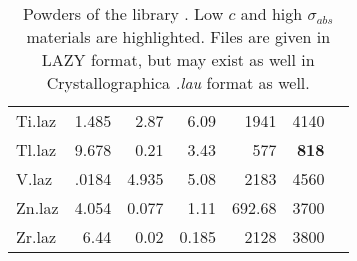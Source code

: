 \begin{table}
\begin{center}
{\begin{small}
\begin{tabular}{|l|rrr|rr|p{}|}
Ti.laz             & 1.485     & 2.87     &6.09      &1941      &4140&\\
Tl.laz             & 9.678     & 0.21     &3.43      &577       &{\bf 818}&\\
V.laz              & .0184     & 4.935    &5.08      &2183      &4560&\\
Zn.laz             & 4.054     & 0.077    &1.11      &692.68    &3700&\\
Zr.laz             & 6.44      & 0.02     &0.185     &2128      &3800&\\
      \hline
    \end{tabular}\end{small}
    \caption{Powders of the \MCS library \cite{icsd_ill,ILLblue}. Low $c$ and high $\sigma_{abs}$ materials are highlighted. Files are given in LAZY format, but may exist as well in Crystallographica {\it .lau} format as well.}
    \label{t:powders-data}
    }
  \end{center}
\end{table}

